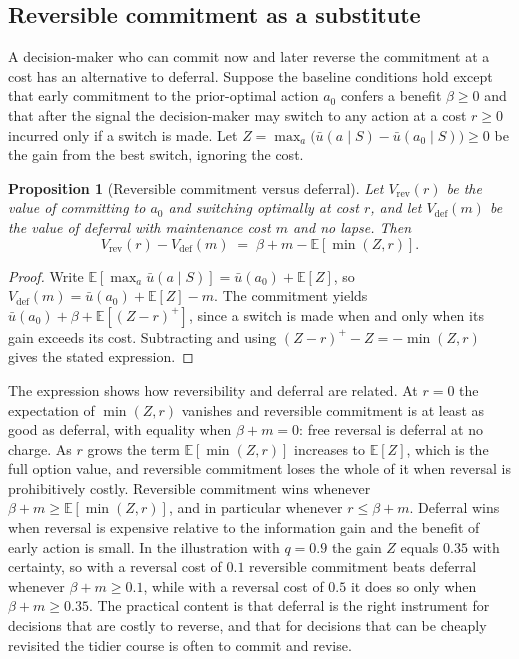 \documentclass[11pt]{article}
\newtheorem{proposition}{Proposition}
\theoremstyle{remark}
\newcommand{\E}{\mathbb{E}}
\begin{document}
\subsection{Reversible commitment as a substitute}

A decision-maker who can commit now and later reverse the commitment at a cost has an alternative to deferral. Suppose the baseline conditions hold except that early commitment to the prior-optimal action $a_0$ confers a benefit $\beta\ge0$ and that after the signal the decision-maker may switch to any action at a cost $r\ge0$ incurred only if a switch is made. Let $Z=\max_a\bigl(\bar u(a\mid S)-\bar u(a_0\mid S)\bigr)\ge0$ be the gain from the best switch, ignoring the cost.

\begin{proposition}[Reversible commitment versus deferral]
Let $V_{\mathrm{rev}}(r)$ be the value of committing to $a_0$ and switching optimally at cost $r$, and let $V_{\mathrm{def}}(m)$ be the value of deferral with maintenance cost $m$ and no lapse. Then
\[
V_{\mathrm{rev}}(r)-V_{\mathrm{def}}(m) \;=\; \beta+m-\E[\min(Z,r)].
\]
\end{proposition}

\begin{proof}
Write $\E[\max_a\bar u(a\mid S)]=\bar u(a_0)+\E[Z]$, so $V_{\mathrm{def}}(m)=\bar u(a_0)+\E[Z]-m$. The commitment yields $\bar u(a_0)+\beta+\E[(Z-r)^+]$, since a switch is made when and only when its gain exceeds its cost. Subtracting and using $(Z-r)^+-Z=-\min(Z,r)$ gives the stated expression.
\end{proof}

The expression shows how reversibility and deferral are related. At $r=0$ the expectation of $\min(Z,r)$ vanishes and reversible commitment is at least as good as deferral, with equality when $\beta+m=0$: free reversal is deferral at no charge. As $r$ grows the term $\E[\min(Z,r)]$ increases to $\E[Z]$, which is the full option value, and reversible commitment loses the whole of it when reversal is prohibitively costly. Reversible commitment wins whenever $\beta+m\ge\E[\min(Z,r)]$, and in particular whenever $r\le\beta+m$. Deferral wins when reversal is expensive relative to the information gain and the benefit of early action is small. In the illustration with $q=0.9$ the gain $Z$ equals $0.35$ with certainty, so with a reversal cost of $0.1$ reversible commitment beats deferral whenever $\beta+m\ge0.1$, while with a reversal cost of $0.5$ it does so only when $\beta+m\ge0.35$. The practical content is that deferral is the right instrument for decisions that are costly to reverse, and that for decisions that can be cheaply revisited the tidier course is often to commit and revise.
\end{document}
